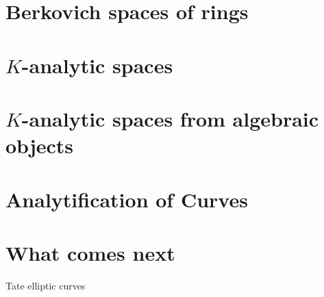 \documentclass[a4paper]{article}
\begin{document}


\section{Berkovich spaces of rings} \label{sec:berkovich_spaces}



\section{$K$-analytic spaces} \label{sec:K_analytic_spaces}



\section{$K$-analytic spaces from algebraic objects} \label{sec:berkovich_analytification_of_schemes}



\section{Analytification of Curves} \label{sec:analytification_of_curves}



\section{What comes next} \label{sec:what_comes_next}

Tate elliptic curves

\printbibliography
\end{document}
